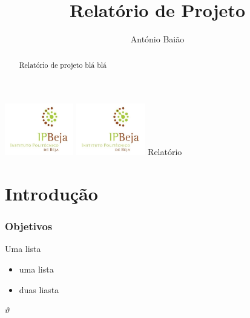 \documentclass[a4paper,11pt]{report}
\title{Relatório de Projeto}
\author{António Baião}
\begin{document}
\clearpage
\pagestyle{empty}
\vspace{0cm}
\hspace{-2cm}
\includegraphics[width=3cm]{images/IpbLogo.JPG}
\hspace{10cm}
\includegraphics[width=3cm]{images/IpbLogo.JPG}
{\rmfamily Relatório} 

\clearpage

\maketitle
\begin{abstract}
Relatório de projeto blá blá
\end{abstract}

\tableofcontents



\chapter{Introdução}
\subsection{Objetivos}

Uma lista
\begin{itemize}
  \item uma lista
  \item duas liasta
\end{itemize}
$\vartheta $
\end{document}
